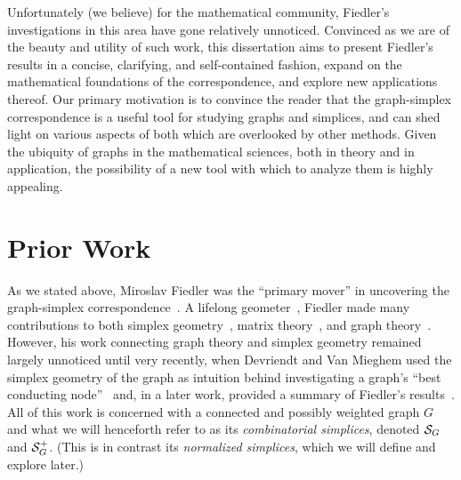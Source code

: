 Unfortunately (we believe) for  the mathematical community,  Fiedler's investigations in this area  have  gone relatively unnoticed. Convinced as we are of  the beauty and  utility of such  work, this dissertation aims to present Fiedler's  results in a concise, clarifying, and self-contained fashion,  expand on the mathematical  foundations of the correspondence, and explore new applications thereof. Our primary motivation is to convince the reader that the graph-simplex correspondence is a  useful tool for studying graphs and simplices,  and can shed light on various  aspects of both which are  overlooked by other  methods. Given the ubiquity of graphs in the mathematical  sciences, both in theory and in application, the possibility of a new tool with which to analyze them is highly  appealing. 





\section{Prior Work}
\label{sec:intro_prior_work}


As we stated  above, Miroslav Fiedler was the ``primary  mover''  in  uncovering the graph-simplex correspondence~\cite{fiedler1993geometric,fiedler2005geometry,fiedler2011matrices}. 
A lifelong geometer~\cite{vavvrin1995miroslav},  Fiedler made many contributions to both simplex geometry~\cite{fiedler1954geometry,fiedler1955geometry,fiedler1956geometry}, matrix theory~\cite{fiedler1998some,fiedler1995moore}, and graph theory~\cite{fiedler1973algebraic,  fiedler1975property, fiedler1976aggregation, fiedler1989laplacian}. 
However, his work connecting graph  theory and simplex geometry remained largely unnoticed until very recently, when Devriendt and Van Mieghem used the simplex geometry of the graph as intuition behind investigating  a graph's ``best conducting node''~\cite{van2017pseudoinverse} and, in a later work, provided a summary  of Fiedler's results~\cite{devriendt2018simplex}. All of this work is concerned  with a connected and possibly  weighted graph $G$ and what we will henceforth  refer to as its  \emph{combinatorial simplices},  denoted $\mathcal{S}_G$ and $\mathcal{S}_G^+$. (This is in contrast its \emph{normalized simplices}, which we  will define and explore later.) 

